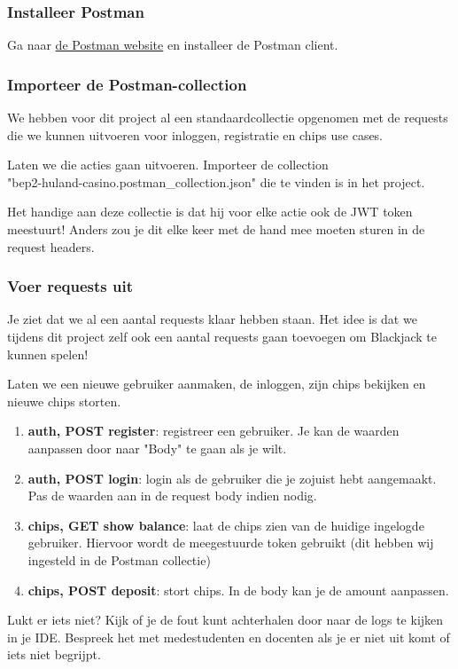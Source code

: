 \documentclass[dutch,a4paper,12pt,doubleside]{book}
\begin{document}
\subsubsection{Installeer Postman}
Ga naar \href{https://www.postman.com/downloads/}{de Postman website} 
en installeer de Postman client.

\subsubsection{Importeer de Postman-collection}
We hebben voor dit project al een standaardcollectie opgenomen met 
de requests die we kunnen uitvoeren voor inloggen, registratie en 
chips use cases.

Laten we die acties gaan uitvoeren. Importeer de collection
\\ "bep2-huland-casino.postman\_collection.json" die te 
vinden is in het project.

Het handige aan deze collectie is dat hij voor elke actie ook 
de JWT token meestuurt! Anders zou je dit elke keer met de hand 
mee moeten sturen in de request headers.

\subsubsection{Voer requests uit}
Je ziet dat we al een aantal requests klaar hebben staan.
Het idee is dat we tijdens dit project zelf ook een aantal requests
gaan toevoegen om Blackjack te kunnen spelen!

Laten we een nieuwe gebruiker aanmaken, de inloggen, zijn chips bekijken en nieuwe chips storten.
\begin{enumerate}
    \item \textbf{auth, POST register}: registreer een gebruiker.
    Je kan de waarden aanpassen door naar "Body" te gaan als je wilt.
    \item \textbf{auth, POST login}: login als de gebruiker die je zojuist
    hebt aangemaakt. Pas de waarden aan in de request body indien nodig.
    \item \textbf{chips, GET show balance}: laat de chips zien van de huidige 
    ingelogde gebruiker. Hiervoor wordt de meegestuurde token gebruikt
    (dit hebben wij ingesteld in de Postman collectie)
    \item \textbf{chips, POST deposit}: stort chips.
    In de body kan je de amount aanpassen.
\end{enumerate}

Lukt er iets niet? Kijk of je de fout kunt achterhalen door 
naar de logs te kijken in je IDE. Bespreek het met medestudenten 
en docenten als je er niet uit komt of iets niet begrijpt.
\end{document}
